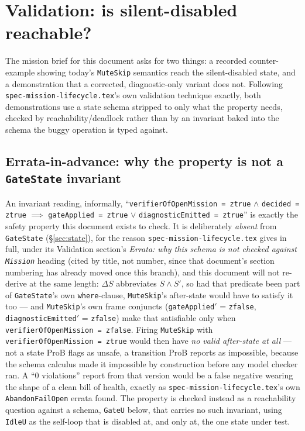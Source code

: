 \documentclass[a4paper,10pt,fleqn]{article}
\newcommand{\fpath}[1]{\texttt{#1}}
\newcommand{\field}[1]{\texttt{#1}}
\begin{document}
\section{Validation: is silent-disabled reachable?}
\label{sec:validation}

The mission brief for this document asks for two things: a recorded
counter-example showing today's \field{MuteSkip} semantics reach the
silent-disabled state, and a demonstration that a corrected,
diagnostic-only variant does not. Following
\fpath{spec-mission-lifecycle.tex}'s own validation technique
exactly, both demonstrations use a state schema stripped to only
what the property needs, checked by reachability/deadlock rather than
by an invariant baked into the schema the buggy operation is typed
against.

\subsection{Errata-in-advance: why the property is not a
\field{GateState} invariant}
\label{sec:errata}

An invariant reading, informally, ``\field{verifierOfOpenMission =
ztrue} $\land$ \field{decided = ztrue} $\implies$ \field{gateApplied
= ztrue} $\lor$ \field{diagnosticEmitted = ztrue}'' is exactly the
safety property this document exists to check. It is deliberately
\emph{absent} from \field{GateState} (\S\ref{sec:state}), for the
reason \fpath{spec-mission-lifecycle.tex} gives in full, under its
Validation section's \emph{Errata: why this schema is not checked
against \field{Mission}} heading (cited by title, not number, since
that document's section numbering has already moved once this
branch), and this document will not re-derive at the same length:
$\Delta S$ abbreviates $S \land S'$, so had that predicate been part
of \field{GateState}'s own \texttt{where}-clause, \field{MuteSkip}'s after-state
would have to satisfy it too --- and \field{MuteSkip}'s own frame
conjuncts (\field{gateApplied}$'$ = \field{zfalse},
\field{diagnosticEmitted}$'$ = \field{zfalse}) make that
satisfiable only when \field{verifierOfOpenMission = zfalse}. Firing
\field{MuteSkip} with \field{verifierOfOpenMission = ztrue} would
then have \emph{no valid after-state at all} --- not a state ProB
flags as unsafe, a transition ProB reports as impossible, because the
schema calculus made it impossible by construction before any model
checker ran. A ``0 violations'' report from that version would be a
false negative wearing the shape of a clean bill of health, exactly
as \fpath{spec-mission-lifecycle.tex}'s own \field{AbandonFailOpen}
errata found. The property is checked instead as a reachability
question against a schema, \field{GateU} below, that carries no such
invariant, using \field{IdleU} as the self-loop that is disabled at,
and only at, the one state under test.
\end{document}

